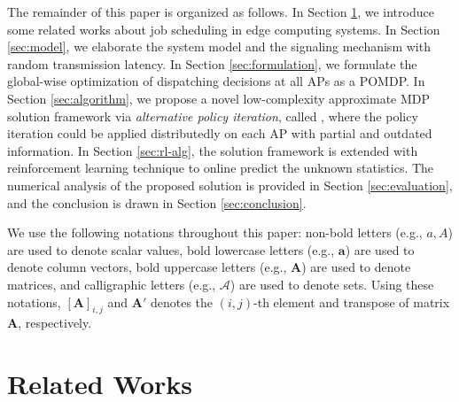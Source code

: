 The remainder of this paper is organized as follows.
In Section \ref{sec:review}, we introduce some related works about job scheduling in edge computing systems.
In Section \ref{sec:model}, we elaborate the system model and the signaling mechanism with random transmission latency.
In Section \ref{sec:formulation}, we formulate the global-wise optimization of dispatching decisions at all APs as a POMDP.
In Section \ref{sec:algorithm}, we propose a novel low-complexity approximate MDP solution framework via \emph{alternative policy iteration}, called \algname, where the policy iteration could be applied distributedly on each AP {with partial and outdated information}.
In Section \ref{sec:rl-alg}, the solution framework is extended with reinforcement learning technique to online predict the unknown statistics.
The numerical analysis of the proposed solution is provided in Section \ref{sec:evaluation}, and the conclusion is drawn in Section \ref{sec:conclusion}.

We use the following notations throughout this paper: 
non-bold letters (e.g., $a, A$) are used to denote scalar values,
bold lowercase letters (e.g., $\mathbf{a}$) are used to denote column vectors,
bold uppercase letters (e.g., $\mathbf{A}$) are used to denote matrices,
and calligraphic letters (e.g., $\mathcal{A}$) are used to denote sets.
Using these notations, $[\mathbf{A}]_{i,j}$ and $\mathbf{A}'$ denotes the $(i,j)$-th element and transpose of matrix $\mathbf{A}$, respectively.

\section{Related Works}
\label{sec:review}

